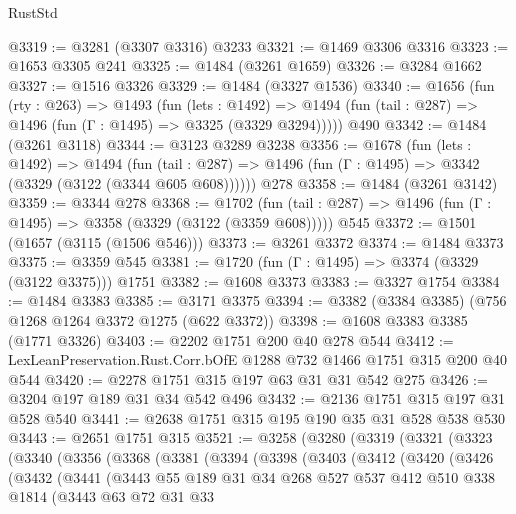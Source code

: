 \begin{lexlean}{RustStd}
\begin{coremodule}
@3319 := @3281 (@3307 @3316) @3233
@3321 := @1469 @3306 @3316
@3323 := @1653 @3305 @241
@3325 := @1484 (@3261 @1659)
@3326 := @3284 @1662
@3327 := @1516 @3326
@3329 := @1484 (@3327 @1536)
@3340 := @1656
    (fun (rty : @263) =>
    @1493
      (fun (lets : @1492) =>
      @1494 (fun (tail : @287) => @1496 (fun (Γ : @1495) => @3325 (@3329 @3294)))))
    @490
@3342 := @1484 (@3261 @3118)
@3344 := @3123 @3289 @3238
@3356 := @1678
    (fun (lets : @1492) =>
    @1494 (fun (tail : @287) => @1496 (fun (Γ : @1495) => @3342 (@3329 (@3122 (@3344 @605 @608))))))
    @278
@3358 := @1484 (@3261 @3142)
@3359 := @3344 @278
@3368 := @1702
    (fun (tail : @287) => @1496 (fun (Γ : @1495) => @3358 (@3329 (@3122 (@3359 @608)))))
    @545
@3372 := @1501 (@1657 (@3115 (@1506 @546)))
@3373 := @3261 @3372
@3374 := @1484 @3373
@3375 := @3359 @545
@3381 := @1720 (fun (Γ : @1495) => @3374 (@3329 (@3122 @3375))) @1751
@3382 := @1608 @3373
@3383 := @3327 @1754
@3384 := @1484 @3383
@3385 := @3171 @3375
@3394 := @3382 (@3384 @3385) (@756 @1268 @1264 @3372 @1275 (@622 @3372))
@3398 := @1608 @3383 @3385 (@1771 @3326)
@3403 := @2202 @1751 @200 @40 @278 @544
@3412 := LexLeanPreservation.Rust.Corr.bOfE @1288 @732 @1466 @1751 @315 @200 @40 @544
@3420 := @2278 @1751 @315 @197 @63 @31 @31 @542 @275
@3426 := @3204 @197 @189 @31 @34 @542 @496
@3432 := @2136 @1751 @315 @197 @31 @528 @540
@3441 := @2638 @1751 @315 @195 @190 @35 @31 @528 @538 @530
@3443 := @2651 @1751 @315
@3521 := @3258
    (@3280
      (@3319
        (@3321
          (@3323
            (@3340
              (@3356
                (@3368
                  (@3381
                    (@3394
                      (@3398
                        (@3403
                          (@3412
                            (@3420
                              (@3426
                                (@3432
                                  (@3441
                                    (@3443
                                      @55
                                      @189
                                      @31
                                      @34
                                      @268
                                      @527
                                      @537
                                      @412
                                      @510
                                      @338
                                      @1814
                                      (@3443
                                        @63
                                        @72
                                        @31
                                        @33

\end{coremodule}
\end{lexlean}
